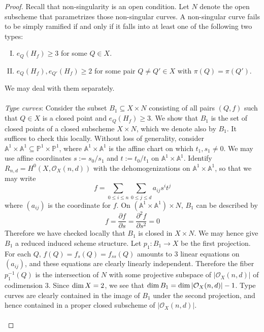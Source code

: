 \documentclass[12pt]{article}
\theoremstyle{plain}
\theoremstyle{definition}
\newcommand{\IA}{\mathbb{A}}
\newcommand{\IP}{\mathbb{P}}
\newcommand{\sO}{\mathcal{O}}
\renewcommand\dim{{\rm dim\,}}
\newcommand{\<}{\langle}
\renewcommand{\>}{\rangle}
\newcommand{\p}{\partial}
\begin{document}
\begin{proof}
Recall that non-singularity is an open condition. Let $N$ denote the open subscheme that parametrizes those non-singular curves. A non-singular curve fails to be simply ramified if and only if it falls into at least one of the following two types: 

\begin{enumerate}[I.]
\item $e_Q(H_f) \ge 3$ for some $Q \in X$. 
\item $e_{Q}(H_f), e_{Q'}(H_f) \ge 2$ for some pair $Q \neq Q' \in X$ with $\pi(Q) = \pi(Q')$. 
\end{enumerate}
We may deal with them separately. \\\\
\textit{Type \uppercase\expandafter{} curves}: Consider the subset $B_1 \subseteq X \times N$ consisting of all pairs $(Q, f)$ such that $Q \in X$ is a closed point and $e_Q(H_f) \ge 3$. We show that $B_1$ is the set of closed points of a closed subscheme $X \times N$, which we denote also by $B_1$. It suffices to check this locally. Without loss of generality, consider $\IA^1 \times \IA^1 \subseteq \IP^1 \times \IP^1$, where $\IA^1 \times \IA^1$ is the affine chart on which $t_1, s_1 \neq 0$. We may use affine coordinates $s := s_0/s_1$ and $t := t_0/t_1$ on $\IA^1 \times \IA^1$. Identify $R_{n, d} = H^0(X, \sO_X(n, d))$ with the dehomogenizations on $\IA^1 \times \IA^1$, so that we may write 
\begin{equation} \label{ident} f = \sum_{0 \le i \le n} \sum_{0 \le j \le d} a_{ij} s^i t^j \end{equation}
where $(a_{ij})$ is the coordinate for $f$. On $(\IA^1 \times \IA^1) \times N$, $B_1$ can be described by 
\begin{equation} f = \frac{\p f}{\p s} = \frac{\p^2 f}{\p s^2} = 0 \end{equation}
Therefore we have checked locally that $B_1$ is closed in $X \times N$. We may hence give $B_1$ a reduced induced scheme structure. Let $p_1 : B_1 \to X$ be the first projection. For each $Q$, $f(Q) = f_s(Q) = f_{ss}(Q)$ amounts to 3 linear equations on $(a_{ij})$, and these equations are clearly linearly independent. Therefore the fiber $p_1^{-1}(Q)$ is the intersection of $N$ with some projective subspace of $|\sO_X(n, d)|$ of codimension $3$. Since $\dim X = 2$, we see that $\dim B_1 = \dim |\sO_X(n, d)| - 1$. Type \uppercase\expandafter{} curves are clearly contained in the image of $B_1$ under the second projection, and hence contained in a proper closed subscheme of $|\sO_X(n, d)|$. \\\\

\end{proof}
\end{document}
